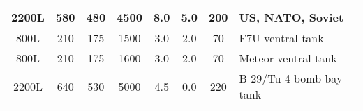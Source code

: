 \begin{twocolumntablefloat}
\begin{twocolumntable}
{\begin{tabular}{cccccccl}
\phantom{}2200L&\phantom{}580&\phantom{}480&\phantom{}4500&8.0&5.0&\phantom{}200&US, NATO, Soviet\\
\midrule
\phantom{0}800L&\phantom{}210&\phantom{}175&\phantom{}1500&3.0&2.0&\phantom{0}70&F7U ventral tank\\
\phantom{0}800L&\phantom{}210&\phantom{}175&\phantom{}1600&3.0&2.0&\phantom{0}70&Meteor ventral tank\\
\phantom{}2200L&\phantom{}640&\phantom{}530&\phantom{}5000&4.5&0.0&\phantom{0}220&B-29/Tu-4 bomb-bay tank\\
\bottomrule
\end{tabular}

}
\end{twocolumntable}
\end{twocolumntablefloat}